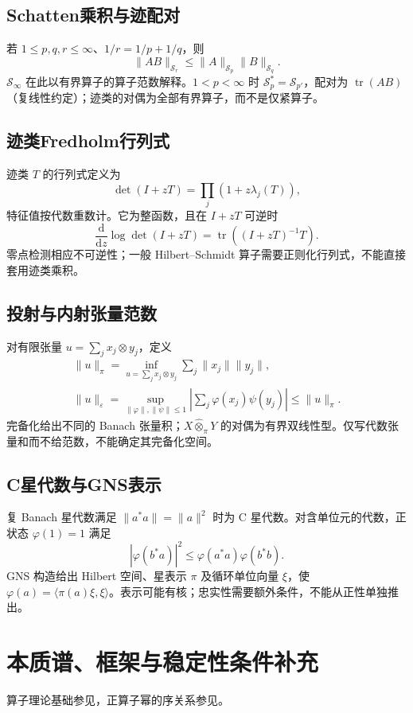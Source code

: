 \documentclass[../main.tex]{subfiles}
\begin{document}
\subsection{Schatten乘积与迹配对}
若 $1\le p,q,r\le\infty$、$1/r=1/p+1/q$，则
\[
\|AB\|_{\mathcal S_r}\le\|A\|_{\mathcal S_p}\|B\|_{\mathcal S_q}.
\]
$\mathcal S_\infty$ 在此以有界算子的算子范数解释。$1<p<\infty$ 时 $\mathcal S_p^*=\mathcal S_{p'}$，配对为 $\operatorname{tr}(AB)$（复线性约定）；迹类的对偶为全部有界算子，而不是仅紧算子。
\subsection{迹类Fredholm行列式}
迹类 $T$ 的行列式定义为
\[
\det(I+zT)=\prod_j(1+z\lambda_j(T)),
\]
特征值按代数重数计。它为整函数，且在 $I+zT$ 可逆时
\[
\frac{\mathrm d}{\mathrm dz}\log\det(I+zT)
=\operatorname{tr}((I+zT)^{-1}T).
\]
零点检测相应不可逆性；一般 Hilbert--Schmidt 算子需要正则化行列式，不能直接套用迹类乘积。
\subsection{投射与内射张量范数}
对有限张量 $u=\sum_jx_j\otimes y_j$，定义
\begin{gather*}
\|u\|_\pi=\inf_{u=\sum_jx_j\otimes y_j}\sum_j\|x_j\|\|y_j\|,\\
\|u\|_\varepsilon=\sup_{\|\varphi\|,\|\psi\|\le1}
\left|\sum_j\varphi(x_j)\psi(y_j)\right|\le\|u\|_\pi.
\end{gather*}
完备化给出不同的 Banach 张量积；$X\widehat\otimes_\pi Y$ 的对偶为有界双线性型。仅写代数张量和而不给范数，不能确定其完备化空间。
\subsection{C星代数与GNS表示}
复 Banach 星代数满足 $\|a^*a\|=\|a\|^2$ 时为 C 星代数。对含单位元的代数，正状态 $\varphi(1)=1$ 满足
\[
|\varphi(b^*a)|^2\le\varphi(a^*a)\varphi(b^*b).
\]
GNS 构造给出 Hilbert 空间、星表示 $\pi$ 及循环单位向量 $\xi$，使 $\varphi(a)=\langle\pi(a)\xi,\xi\rangle$。表示可能有核；忠实性需要额外条件，不能从正性单独推出。

\section{本质谱、框架与稳定性条件补充}
算子理论基础参见\cite{brezis}，正算子幂的序关系参见\cite{bhatia}。
\end{document}
